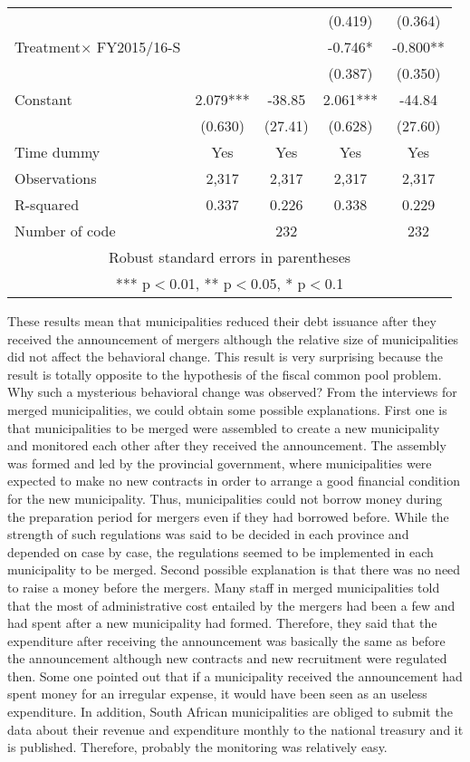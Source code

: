 \documentclass[dvipdfmx]{jsarticle}
\begin{document}
\begin{center}
\begin{tabular}{lcccc}
 &  &  & (0.419) & (0.364) \\
Treatment$\times$ FY2015/16-S &  &  & -0.746* & -0.800** \\
 &  &  & (0.387) & (0.350) \\
Constant & 2.079*** & -38.85 & 2.061*** & -44.84 \\
 & (0.630) & (27.41) & (0.628) & (27.60) \\ \hline
Time dummy &Yes  &Yes  &Yes  &Yes  \\
Observations & 2,317 & 2,317 & 2,317 & 2,317 \\
R-squared & 0.337 & 0.226 & 0.338 & 0.229 \\
 Number of code &  & 232 &  & 232 \\ \hline
\multicolumn{5}{c}{ Robust standard errors in parentheses} \\
\multicolumn{5}{c}{ *** p$<$0.01, ** p$<$0.05, * p$<$0.1} \\
\end{tabular}
\end{center}
\quad These results mean that municipalities reduced their debt issuance after they received the announcement of mergers although the relative size of municipalities did not affect the behavioral change. This result is very surprising because the result is totally opposite to the hypothesis of the fiscal common pool problem. Why such a mysterious behavioral change was observed? From the interviews for merged municipalities, we could obtain some possible explanations. First one is that municipalities to be merged were assembled to create a new municipality and  monitored each other after they received the announcement. The assembly was formed and led by the provincial government, where municipalities were expected to make no new contracts in order to arrange a good financial condition for the new municipality. Thus, municipalities could not borrow money during the preparation period for mergers even if they had borrowed before. While the strength of such regulations was said to be decided in each province and depended on case by case, the regulations seemed to be implemented in each municipality to be merged. Second possible explanation is that there was no need to raise a money before the mergers. Many staff in merged municipalities told that the most of administrative cost entailed by the mergers had been a few and had spent after a new municipality had formed. Therefore, they said that the expenditure after receiving the announcement was basically the same as before the announcement although new contracts and new recruitment were regulated then. Some one pointed out that if a municipality received the announcement had spent money for an irregular expense, it would have been seen as an useless expenditure. In addition, South African municipalities are obliged to submit the data about their revenue and expenditure monthly to the national treasury and it is published. Therefore, probably the monitoring was relatively easy.\\
\end{document}
